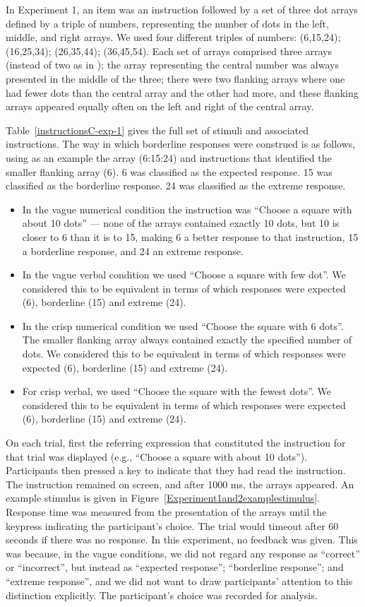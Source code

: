 \documentclass[ %
  graybox       %
 ,envcountchap  %
 ,sectrefs      %
]{svmono}
\begin{document}
In Experiment 1, an item was an instruction followed by a set of three dot arrays defined by a triple of numbers, representing the number of dots in the left, middle, and right arrays. We used four different triples of numbers: (6,15,24); (16,25,34); (26,35,44); (36,45,54). Each set of arrays comprised three arrays (instead of two as in \citet{green2013utility}); the array representing the central number was always presented in the middle of the three; there were two flanking arrays where one had fewer dots than the central array and the other had more, and these flanking arrays appeared equally often on the left and right of the central array.

Table~\ref{instructionsC-exp-1} gives the full set of stimuli and associated instructions. The way in which borderline responses were construed is as follows, using as an example the array (6:15:24) and instructions that identified the smaller flanking array (6). 6 was classified as the expected response. 15 was classified as the borderline response. 24 was classified as the extreme response.

\begin{itemize}
	\item In the vague numerical condition the instruction was ``Choose a square with about 10 dots'' --- none of the arrays contained exactly 10 dots, but 10 is closer to 6 than it is to 15, making 6 a better response to that instruction, 15 a borderline response, and 24 an extreme response.
	\item In the vague verbal condition we used ``Choose a square with few dot''. We considered this to be equivalent in terms of which responses were expected (6), borderline (15) and extreme (24).
	\item In the crisp numerical condition we used ``Choose the square with 6 dots''. The smaller flanking array always contained exactly the specified number of dots. We considered this to be equivalent in terms of which responses were expected (6), borderline (15) and extreme (24).
	\item For crisp verbal, we used ``Choose the square with the fewest dots''. We considered this to be equivalent in terms of which responses were expected (6), borderline (15) and extreme (24).
\end{itemize}

On each trial, first the referring expression that constituted the instruction for that trial was displayed (e.g., ``Choose a square with about 10 dots''). Participants then pressed a key to indicate that they had read the instruction. The instruction remained on screen, and after 1000 ms, the arrays appeared. An example stimulus is given in Figure~\ref{Experiment1and2examplestimulus}. Response time was measured from the presentation of the arrays until the keypress indicating the participant's choice. The trial would timeout after 60 seconds if there was no response. In this experiment, no feedback was given. This was because, in the vague conditions, we did not regard any response as ``correct'' or ``incorrect'', but instead as ``expected response''; ``borderline response''; and ``extreme response'', and we did not want to draw participants' attention to this distinction explicitly. The participant's choice was recorded for analysis.
\end{document}
